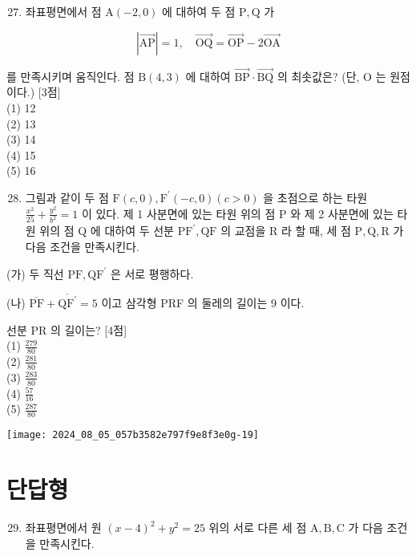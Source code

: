 \documentclass[10pt]{article}
\begin{document}
\begin{enumerate}
  \setcounter{enumi}{26}
  \item 좌표평면에서 점 \(\mathrm{A}(-2,0)\) 에 대하여 두 점 \(\mathrm{P}, \mathrm{Q}\) 가
\end{enumerate}

\[
|\overrightarrow{\mathrm{AP}}|=1, \quad \overrightarrow{\mathrm{OQ}}=\overrightarrow{\mathrm{OP}}-2 \overrightarrow{\mathrm{OA}}
\]

를 만족시키며 움직인다. 점 \(\mathrm{B}(4,3)\) 에 대하여 \(\overrightarrow{\mathrm{BP}} \cdot \overrightarrow{\mathrm{BQ}}\) 의 최솟값은? (단, O 는 원점이다.) [3점]\\
(1) 12\\
(2) 13\\
(3) 14\\
(4) 15\\
(5) 16

\begin{enumerate}
  \setcounter{enumi}{27}
  \item 그림과 같이 두 점 \(\mathrm{F}(c, 0), \mathrm{F}^{\prime}(-c, 0)(c>0)\) 을 초점으로 하는 타원 \(\frac{x^{2}}{25}+\frac{y^{2}}{b^{2}}=1\) 이 있다. 제 1 사분면에 있는 타원 위의 점 P 와 제 2 사분면에 있는 타원 위의 점 Q 에 대하여 두 선분 \(\mathrm{PF}^{\prime}, \mathrm{QF}\) 의 교점을 R 라 할 때, 세 점 \(\mathrm{P}, \mathrm{Q}, \mathrm{R}\) 가 다음 조건을 만족시킨다.
\end{enumerate}

(가) 두 직선 \(\mathrm{PF}, \mathrm{QF}^{\prime}\) 은 서로 평행하다.

(나) \(\overline{\mathrm{PF}}+\overline{\mathrm{QF}^{\prime}}=5\) 이고 삼각형 PRF 의 둘레의 길이는 9 이다.

선분 PR 의 길이는? [4점]\\
(1) \(\frac{279}{80}\)\\
(2) \(\frac{281}{80}\)\\
(3) \(\frac{283}{80}\)\\
(4) \(\frac{57}{16}\)\\
(5) \(\frac{287}{80}\)

\begin{center}
\texttt{[image: 2024\_08\_05\_057b3582e797f9e8f3e0g-19]}
\end{center}

\section*{단답형}
\begin{enumerate}
  \setcounter{enumi}{28}
  \item 좌표평면에서 원 \((x-4)^{2}+y^{2}=25\) 위의 서로 다른 세 점 \(\mathrm{A}, \mathrm{B}, \mathrm{C}\) 가 다음 조건을 만족시킨다.
\end{enumerate}
\end{document}

